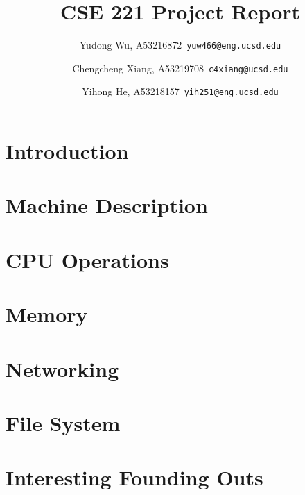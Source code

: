 \documentclass{article}
\begin{document}

\setlength{\parskip}{1em}


\title{CSE 221 Project Report}

\author{Yudong Wu, A53216872\ \texttt{yuw466@eng.ucsd.edu}
        \and
        Chengcheng Xiang, A53219708\ \texttt{c4xiang@ucsd.edu}
        \and
        Yihong He, A53218157\ \texttt{yih251@eng.ucsd.edu}
}

\maketitle

\lstset{
    numbers=left,
    numberstyle=\footnotesize,
    stepnumber=1,
    numbersep=5pt,
    basicstyle=\footnotesize,
    frame=single,
    tabsize=2,
    breaklines=true,
    xleftmargin=2em,
    xrightmargin=2em,
}

\section{Introduction}




\section{Machine Description}



\section{CPU Operations}


\section{Memory}


\section{Networking}


\section{File System}


\section{Interesting Founding Outs}



\printbibliography
\end{document}

